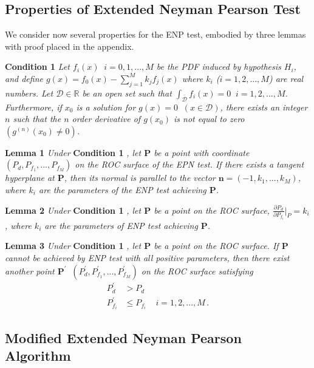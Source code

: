 \documentclass[12pt,journal,a4paper,twoside,onecolumn,draft]{IEEEtran}
\begin{document}
\begin{spacing}{2.5}
\subsection{Properties of Extended Neyman Pearson Test}
We consider now several properties for the ENP test, embodied by three lemmas with proof placed in the appendix.

\noindent \textbf{Condition 1}
\textit{
\noindent Let $f_i(x) \;\;i=0, 1, ..., M$ be the PDF induced by hypothesis $H_i$, and define $g(x) = f_0(x) - \sum_{j=1}^{M} k_jf_j(x)$ where $k_i$  ($i = 1, 2, ..., M$) are real numbers. Let $\mathcal{D} \in \mathbb{R}$ be an open set such that $\int_{\bar{\mathcal{D}}}f_i(x)=0\;\;i = 1, 2, ..., M$. Furthermore,  if $x_0$ is a solution  for $g(x) = 0 \;\;(x \in \mathcal{D})$, there exists an integer $n$ such that  the $n$ order derivative of $g(x_0)$ is not equal to zero $(g^{(n)}(x_0) \neq 0)$.
}

\noindent \textbf{Lemma 1}
\textit{
\noindent Under}
\textbf{Condition 1}
\textit{, let $\mathbf{P}$ be a point with coordinate $(P_d, P_{f_1}, ..., P_{f_M})$ on the ROC surface of the EPN test. If there exists a tangent hyperplane at $\mathbf{P}$, then its normal is parallel to the vector $\mathbf{n} = (-1, k_1, ..., k_M)$, where $k_i$ are the parameters of the ENP test achieving $\mathbf{P}$.
}

\noindent \textbf{Lemma 2}
\textit{
\noindent
Under}
\textbf{Condition 1}
\textit{, let $\mathbf{P}$ be a point on the ROC surface, $\frac{\partial P_d}{\partial P_{f_i}} \bigg|_P = k_i$, where $k_i$ are the parameters of ENP test achieving $\mathbf{P}$.
}

\noindent \textbf{Lemma 3}
\textit{
\noindent
Under}
\textbf{Condition 1}
\textit{, let $\mathbf{P}$ be a point on the ROC surface. If  $\mathbf{P}$ cannot be achieved by ENP test with all positive parameters, then there  exist another point $\mathbf{P}^\prime\;\; (P_d^\prime, P_{f_1}^\prime, ..., P_{f_M}^\prime)$ on the ROC surface satisfying
}
\begin{equation}
  \label{equ: lemma 3 equation}
  \begin{split}
    P_d^\prime &> P_d\\
    P_{f_i}^\prime &\leq P_{f_i}\;\;\;\;i = 1, 2, ..., M\,.
  \end{split}
\end{equation}

\subsection{Modified Extended Neyman Pearson Algorithm}



\end{spacing}
\end{document}
